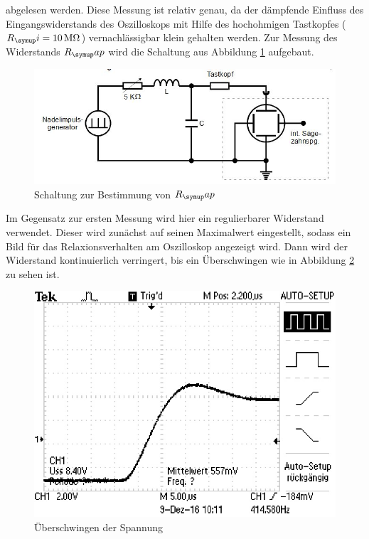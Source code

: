 abgelesen werden. Diese Messung ist relativ genau, da der dämpfende Einfluss
des Eingangswiderstands des Oszilloskops mit Hilfe des hochohmigen Tastkopfes
($R_\su{i}=10\,\si{\mega\ohm}$) vernachlässigbar klein gehalten werden.
Zur Messung des Widerstands $R_\su{ap}$ wird die Schaltung aus Abbildung
\ref{fig:rapschlt} aufgebaut. \\
\begin{figure}[h]
  \centering
  \includegraphics[width=\textwidth]{Bilder/RapSchalt.JPG}
  \caption{Schaltung zur Bestimmung von $R_\su{ap}$\,\cite{354}}
  \label{fig:rapschlt}
\end{figure}
\newpage
Im Gegensatz zur ersten Messung wird hier ein regulierbarer Widerstand verwendet.
Dieser wird zunächst auf seinen Maximalwert eingestellt, sodass ein Bild
für das Relaxionsverhalten am Oszilloskop angezeigt wird. Dann wird der
Widerstand kontinuierlich verringert, bis ein Überschwingen wie in
Abbildung \ref{fig:aperid} zu sehen ist.
\begin{figure}[h]
  \centering
  \includegraphics{Bilder/aperid.JPG}
  \caption{Überschwingen der Spannung}
  \label{fig:aperid}
\end{figure} \\

